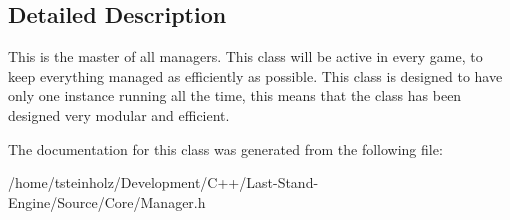\subsection{Detailed Description}
This is the master of all managers. This class will be active in every game, to keep everything managed as efficiently as possible. This class is designed to have only one instance running all the time, this means that the class has been designed very modular and efficient. 

The documentation for this class was generated from the following file\+:\begin{DoxyCompactItemize}
\item 
/home/tsteinholz/\+Development/\+C++/\+Last-\/\+Stand-\/\+Engine/\+Source/\+Core/Manager.\+h\end{DoxyCompactItemize}
